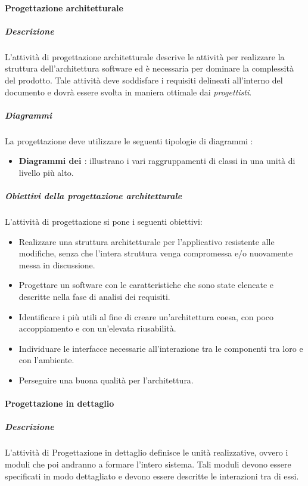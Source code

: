 \paragraph{Progettazione architetturale}
\subparagraph{Descrizione}
L'attività di progettazione architetturale descrive le attività per realizzare la struttura dell'architettura software ed è necessaria per dominare la complessità del prodotto. Tale attività deve soddisfare i requisiti delineati all'interno del documento \AdR{} e dovrà essere svolta in maniera ottimale dai \textit{progettisti}.

\subparagraph{Diagrammi}
La progettazione deve utilizzare le seguenti tipologie di diagrammi :
\begin{itemize}
\item
\textbf{Diagrammi dei \textit{}}: illustrano i vari raggruppamenti di classi in una unità di livello più alto.
\end{itemize}

\subparagraph{Obiettivi della progettazione architetturale}
L'attività di progettazione si pone i seguenti obiettivi:
\begin{itemize}
\item Realizzare una struttura architetturale per l'applicativo  resistente alle modifiche, senza che l'intera struttura venga compromessa e/o nuovamente messa in discussione.
\item Progettare un software con le caratteristiche che sono state elencate e descritte nella fase di analisi dei requisiti.
\item Identificare i  più utili al fine di creare un'architettura coesa, con poco accoppiamento e con un'elevata riusabilità.
\item Individuare le interfacce necessarie all'interazione tra le componenti tra loro e con l'ambiente.
\item Perseguire una buona qualità per l'architettura.
\end{itemize}

\paragraph{Progettazione in dettaglio}

\subparagraph{Descrizione}
L'attività di Progettazione in dettaglio definisce le unità realizzative, ovvero i moduli che poi andranno a formare l'intero sistema. Tali moduli devono essere specificati in modo dettagliato e devono essere descritte le interazioni tra di essi.

